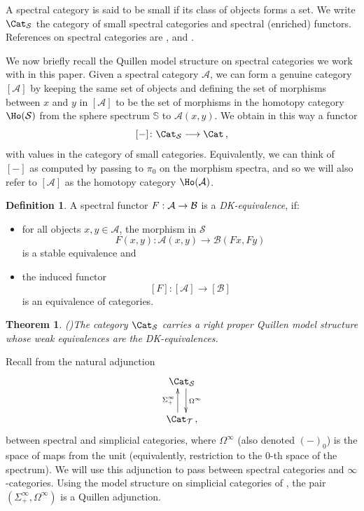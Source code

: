 \documentclass{amsart}
\renewcommand{\to}{\mathchoice{\longrightarrow}{\rightarrow}{\rightarrow}{\rightarrow}}
\newcommand{\cA}{{\mathcal A}}
\newcommand{\cB}{{\mathcal B}}
\newcommand{\bS}{\mathbb{S}}
\newcommand{\Spcat}{\Cat_\mathcal{S}}%
\newcommand{\Spt}{\mathcal{S}}%
\newcommand{\Scat}{\Cat_{\mathcal{T}}}%
\newcommand{\too}{\longrightarrow}%
\renewcommand{\i}{\infty}
\numberwithin{equation}{section}
\newtheorem{theorem}[equation]{Theorem}
\theoremstyle{definition}
\newtheorem{definition}[equation]{Definition}
\begin{document}
A spectral category is said to be small if its class of objects forms
a set.  We write $\Spcat$ the category of small spectral categories
and spectral (enriched) functors.  References on spectral categories
are \cite[\S2]{BM}, \cite[Appendix\,A]{SS} and \cite[\S 2]{Spectral}.

We now briefly recall the Quillen model structure on spectral
categories we work with in this paper.  Given a spectral category
$\cA$, we can form a genuine category $[\cA]$ by keeping the same set
of objects and defining the set of morphisms between $x$ and $y$ in
$[\cA]$ to be the set of morphisms in the homotopy category $\Ho(\Spt)$
from the sphere spectrum $\bS$ to $\cA(x,y)$.  We obtain in this way a
functor $$ [-] \colon \Spcat \too \Cat \,,$$ with values in the
category of small categories.  Equivalently, we can think of $[-]$ as
computed by passing to $\pi_0$ on the morphism spectra, and so we will
also refer to $[\cA]$ as the homotopy category $\Ho(\cA)$.

\begin{definition}\label{def:stable}
A spectral functor $F:\cA \to \cB$ is a {\em DK-equivalence}, if:
\begin{itemize}
\item for all objects $x,y \in \cA$, the morphism in $\Spt$
$$ F(x,y):\cA(x,y) \too \cB(Fx,Fy) $$
is a stable equivalence and
\item the induced functor
$$ [F]:[\cA] \too [\cB]$$
is an equivalence of categories.
\end{itemize}
\end{definition}

\begin{theorem}{(\cite[5.10]{Spectral})}\label{thm:Quillenstable}
The category $\Spcat$ carries a right proper Quillen model structure
whose weak equivalences are the DK-equivalences.
\end{theorem}

Recall from \cite[\S\,2]{Spectral} the natural adjunction 
\begin{equation}\label{eqn:specsimp}
\xymatrix{
\Spcat \ar@<1ex>[d]^{\Omega^\i} \\
 \Scat \ar@<1ex>[u]^{\Sigma^{\infty}_+} \,,
}
\end{equation}
between spectral and simplicial categories, where $\Omega^\i$ (also
denoted $(-)_0$) is the space of maps from the unit (equivalently,
restriction to the $0$-th space of the spectrum).  We will use this
adjunction to pass between spectral categories and $\i$-categories.
Using the model structure on simplicial categories of \cite{Bergner},
the pair $(\Sigma^{\infty}_+, \Omega^\i)$ is a Quillen adjunction. 
\end{document}
